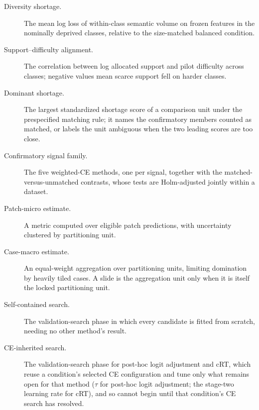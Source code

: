 \documentclass[11pt]{article}
\begin{document}
\begin{description}
  \item[Diversity shortage.] The mean log loss of within-class semantic volume on frozen features in the nominally deprived classes, relative to the size-matched balanced condition.
  \item[Support--difficulty alignment.] The correlation between log allocated support and pilot difficulty across classes; negative values mean scarce support fell on harder classes.
  \item[Dominant shortage.] The largest standardized shortage score of a comparison unit under the prespecified matching rule; it names the confirmatory members counted as matched, or labels the unit ambiguous when the two leading scores are too close.
  \item[Confirmatory signal family.] The five weighted-CE methods, one per signal, together with the matched-versus-unmatched contrasts, whose tests are Holm-adjusted jointly within a dataset.
  \item[Patch-micro estimate.] A metric computed over eligible patch predictions, with uncertainty clustered by partitioning unit.
  \item[Case-macro estimate.] An equal-weight aggregation over partitioning units, limiting domination by heavily tiled cases. A slide is the aggregation unit only when it is itself the locked partitioning unit.
  \item[Self-contained search.] The validation-search phase in which every candidate is fitted from scratch, needing no other method's result.
  \item[CE-inherited search.] The validation-search phase for post-hoc logit adjustment and cRT, which reuse a condition's selected CE configuration and tune only what remains open for that method ($\tau$ for post-hoc logit adjustment; the stage-two learning rate for cRT), and so cannot begin until that condition's CE search has resolved.
\end{description}

\clearpage


\end{document}
